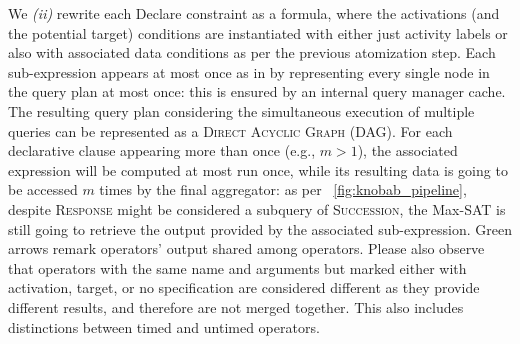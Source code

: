 We \textit{(ii)} rewrite each Declare constraint as a \xLTLf formula, where the activations (and the potential target) conditions are instantiated with either just activity labels or also with associated data conditions as per the previous atomization step. 
Each sub-expression appears at most once as in \cite{BellatrecheKB21} by representing every single node in the query plan at most once: this is ensured by an internal query manager cache. The resulting query plan considering the simultaneous execution of multiple queries can be represented as a \textsc{Direct Acyclic Graph} (DAG).  
For each declarative clause appearing more than once (e.g., $m>1$), the associated \xLTLf expression will be computed at most run once, while its resulting data is going to be accessed $m$ times by the final aggregator: as per \figurename~\ref{fig:knobab_pipeline}, despite \textsc{Response} might be considered a subquery of \textsc{Succession}, the Max-SAT is still going to retrieve the output provided by the associated sub-expression. Green arrows remark operators' output shared among operators. Please also observe that operators with the same name and arguments but marked either with activation, target, or no specification are considered different as they provide different results, and therefore are not merged together. 
This also includes distinctions between timed and untimed operators.

